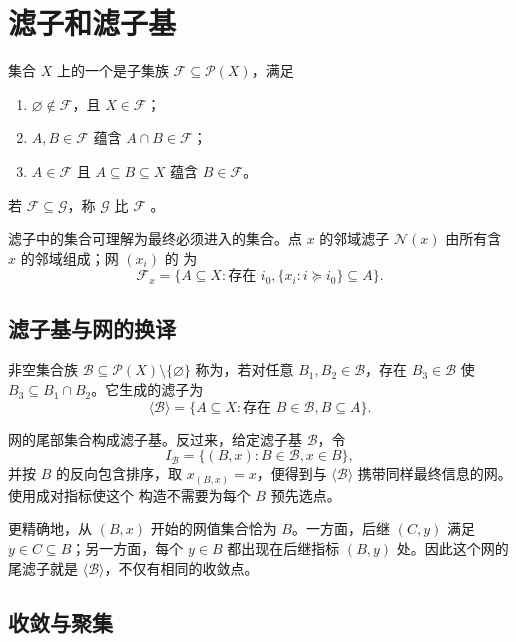 \section{滤子和滤子基}

\begin{definition}[滤子]
集合 \(X\) 上的一个是子集族 \(\mathcal F\subseteq
\mathcal P(X)\)，满足
\begin{enumerate}[label=\textup{(\roman*)}]
 \item \(\varnothing\notin\mathcal F\)，且 \(X\in\mathcal F\)；
 \item \(A,B\in\mathcal F\) 蕴含 \(A\cap B\in\mathcal F\)；
 \item \(A\in\mathcal F\) 且 \(A\subseteq B\subseteq X\) 蕴含
 \(B\in\mathcal F\)。
\end{enumerate}
若 \(\mathcal F\subseteq\mathcal G\)，称 \(\mathcal G\) 比
\(\mathcal F\) 。
\end{definition}

滤子中的集合可理解为最终必须进入的集合。点 \(x\) 的邻域滤子
\(\mathcal N(x)\) 由所有含 \(x\) 的邻域组成；网 \((x_i)\) 的
为
\[
 \mathcal F_x=\{A\subseteq X:\text{存在 }i_0,
 \{x_i:i\succcurlyeq i_0\}\subseteq A\}.
\]

\subsection{滤子基与网的换译}

\begin{definition}[滤子基]
非空集合族 \(\mathcal B\subseteq\mathcal P(X)\setminus\{\varnothing\}\)
称为，若对任意 \(B_1,B_2\in\mathcal B\)，存在
\(B_3\in\mathcal B\) 使 \(B_3\subseteq B_1\cap B_2\)。它生成的滤子为
\[
 \langle\mathcal B\rangle
 =\{A\subseteq X:\text{存在 }B\in\mathcal B, B\subseteq A\}.
\]
\end{definition}

网的尾部集合构成滤子基。反过来，给定滤子基 \(\mathcal B\)，令
\[
 I_{\mathcal B}=\{(B,x):B\in\mathcal B, x\in B\},
\]
并按 \(B\) 的反向包含排序，取 \(x_{(B,x)}=x\)，便得到与
\(\langle\mathcal B\rangle\) 携带同样最终信息的网。使用成对指标使这个
构造不需要为每个 \(B\) 预先选点。

更精确地，从 \((B,x)\) 开始的网值集合恰为 \(B\)。一方面，后继
\((C,y)\) 满足 \(y\in C\subseteq B\)；另一方面，每个 \(y\in B\)
都出现在后继指标 \((B,y)\) 处。因此这个网的尾滤子就是
\(\langle\mathcal B\rangle\)，不仅有相同的收敛点。

\subsection{收敛与聚集}

